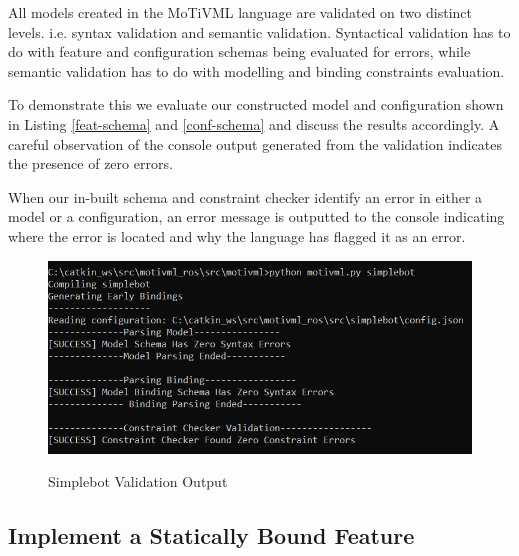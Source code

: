 \documentclass{article}
\begin{document}
All models created in the MoTiVML language are validated on two distinct levels. i.e. syntax validation and semantic validation. Syntactical validation has to do with feature and configuration schemas being evaluated for errors, while semantic validation has to do with modelling and binding constraints evaluation.

To demonstrate this we evaluate our constructed model and configuration shown in Listing \ref{feat-schema} and \ref{conf-schema} and discuss the results accordingly. A careful observation of  the console output generated from the validation indicates the presence of zero errors.

When our in-built schema and constraint checker identify an error in either a model or a configuration, an error message is outputted to the console indicating where the error is located and why the language has flagged it as an error.

\begin{figure}[H]
	\caption{Simplebot Validation Output}
	\centering
	\includegraphics[width=\columnwidth]{images/validate.png}
	\label{validation}
\end{figure}

\subsection{Implement a Statically Bound Feature}
\end{document}
